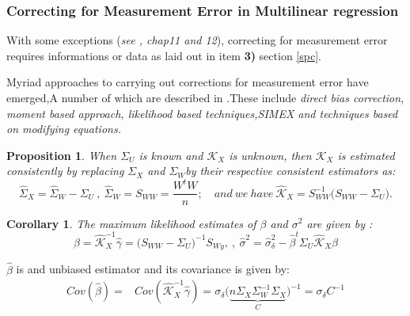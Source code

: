 \documentclass[12pt]{report}
\newtheorem {proposition}{Proposition}[section]  %
\newtheorem{corollaire}{Corollary}
\begin{document}
	\subsubsection{Correcting for Measurement Error in Multilinear regression}


With some exceptions (\textit{see \cite{nref1}, chap11 and 12}), correcting for measurement error requires informations or data as laid out in item \textbf{3)} section \ref{spc}.

Myriad approaches to carrying out corrections for measurement error have emerged,A number of which are described in \cite{nref1}.These include \textit{direct bias correction, moment based approach, likelihood based techniques,SIMEX and techniques based on modifying equations.} 

\begin{proposition}
	When  $\Sigma_{U}$ is known and $\mathcal{K}_{X}$ is unknown, then $\mathcal{K}_{X}$ is estimated consistently by replacing $\Sigma_{X}$ and $\Sigma_{W}$by their respective consistent estimators as:
	\begin{equation}
		\hat{\Sigma}_{X}=\hat{\Sigma}_{W}-\Sigma_{U}\ ,\ \hat{\Sigma}_{W}=S_{WW}=\frac{W^{t}W}{n};\quad and\ we\ have\ \hat{\mathcal{K}}_{X}=S_{WW}^{-1}\big(S_{WW}-\Sigma_{U}\big).
		\label{est}
	\end{equation}
\end{proposition}

\begin{corollaire}
	The maximum likelihood estimates of $\beta$ and $\sigma^{2}$ are given by :
	\begin{equation}
		\hat{\beta}=\hat{\mathcal{K}}_{X}^{-1}\hat{\gamma}=\big(S_{WW}-\Sigma_{U}\big)^{-1}S_{Wy},\ ,\ \hat{\sigma}^{2}=\hat{\sigma}_{\delta}^{2}-\hat{\beta}^{t}\Sigma_{U}\hat{\mathcal{K}}_{X}\hat{\beta}
		\label{f53}
	\end{equation}
\end{corollaire}
$\hat{\beta}$ is and unbiased estimator and its covariance is given by:
\begin{align*}
	Cov(\hat{\beta})=&Cov(\hat{\mathcal{K}}_{X}^{-1}\hat{\gamma})=\sigma_{\delta}\big(\underbrace{n\Sigma_{X}\Sigma_{W}^{-1}\Sigma_{X}}_{C}\big)^{-1} =\sigma_{\delta}C^{-1}
	\label{f54}
\end{align*}
\end{document}
